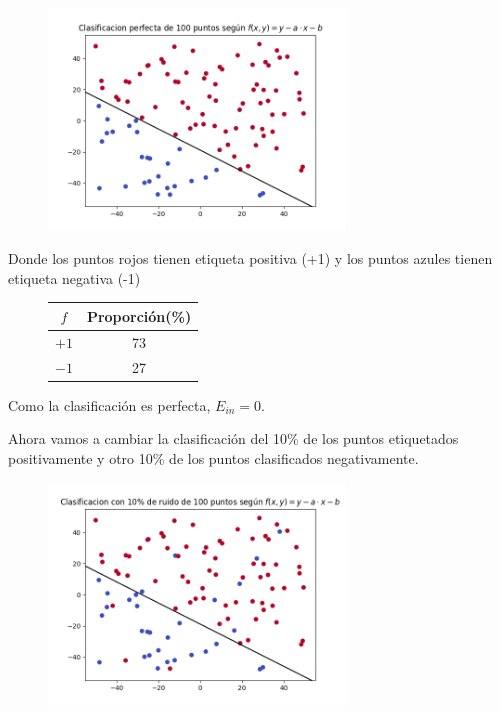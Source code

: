 \documentclass{article}
\begin{document}
    \begin{figure}[h]
        \centering
        \includegraphics[width=0.7\textwidth]{perfecto.png}
    \end{figure}

    Donde los puntos rojos tienen etiqueta positiva (+1) y los puntos azules
    tienen etiqueta negativa (-1)

    \begin{figure}[h]
        \centering
        \begin{tabular}{ |c|c| }
            \hline
            $f$ & Proporción(\%) \\
            \hline
            $+1$              & 73  \\
            \hline
            $-1$              & 27 \\
            \hline
        \end{tabular}
    \end{figure}
    Como la clasificación es perfecta, $E_{in} = 0$.

    \pagebreak

    Ahora vamos a cambiar la clasificación del 10\% de los puntos etiquetados positivamente y otro 10\%
    de los puntos clasificados negativamente.

    \begin{figure}[h]
        \centering
        \includegraphics[width=0.7\textwidth]{ruido.png}
    \end{figure}
\end{document}
